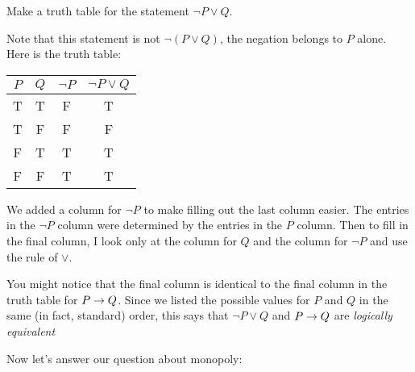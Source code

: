 \documentclass[12pt]{article}
\begin{document}
\newpage
\begin{example}
 Make a truth table for the statement $\neg P \vee Q$.

\begin{solution}
Note that this statement is not $\neg(P \vee Q)$, the negation belongs to $P$ alone.  Here is the truth table:

 \begin{center}
	 \begin{tabular}{c|c||c|c}
 $P$ & $Q$ & $\neg P$ & $\neg P \vee Q$ \\ \hline
 T & T & F & T\\
 T & F & F & F\\
 F & T & T & T\\
 F & F & T & T
\end{tabular}
\end{center}

We added a column for $\neg P$ to make filling out the last column easier.  The entries in the $\neg P$ column were determined by the entries in the $P$ column.  Then to fill in the final column, I look only at the column for $Q$ and the column for $\neg P$ and use the rule of $\vee$.  

You might notice that the final column is identical to the final column in the truth table for $P \rightarrow Q$.  Since we listed the possible values for $P$ and $Q$ in the same (in fact, standard) order, this says that $\neg P \vee Q$ and $P \rightarrow Q$ are {\em logically equivalent}
\end{solution}

\end{example}

Now let's answer our question about monopoly:
\end{document}
